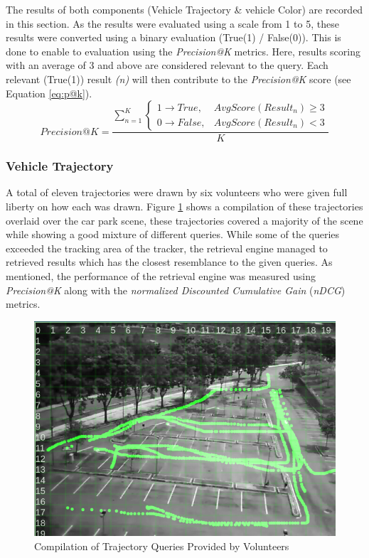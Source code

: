 The results of both components (Vehicle Trajectory \& vehicle Color) are recorded in this section. As the results were evaluated using a scale from 1 to 5, these results were converted using a binary evaluation (True(1) / False(0)). This is done to enable to evaluation using the \textit{Precision@K} metrics. Here, results scoring with an average of 3 and above are considered relevant to the query. Each relevant (True(1)) result \textit{(n)} will then contribute to the \textit{Precision@K} score (see Equation \ref{eq:p@k}). 
 \begin{equation}
\label{eq:p@k}
Precision@K =  \frac{\sum_{n=1}^K \begin{cases}1 \rightarrow True, & AvgScore(Result_n)\geq 3\\0 \rightarrow False, & AvgScore(Result_n)< 3 \end{cases}} {K}
\end{equation}

\subsubsection{Vehicle Trajectory}
A total of eleven trajectories were drawn by six volunteers who were given full liberty on how each was drawn. Figure \ref{fig:versionTwoTrajquery} shows a compilation of these trajectories overlaid over the car park scene, these trajectories covered a majority of the scene while showing a good mixture of different queries.
While some of the queries exceeded the tracking area of the tracker, the retrieval engine managed to retrieved results which has the closest resemblance to the given queries. As mentioned, the performance of the retrieval engine was measured using \textit{Precision@K} along with the \textit{normalized Discounted Cumulative Gain} (\textit{nDCG}) metrics. 

\begin{figure}[!t]
  \centering
    \includegraphics[width=0.8\linewidth]{image/retrievalTwo/trajquery.png}
  \caption{Compilation of Trajectory Queries Provided by Volunteers}
  \label{fig:versionTwoTrajquery}
\end{figure}

